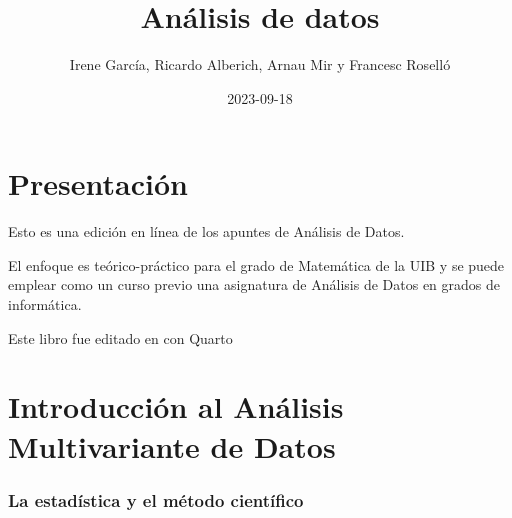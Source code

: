 \documentclass[
  letterpaper,
  DIV=11,
  numbers=noendperiod]{scrreprt}
\title{Análisis de datos}
\author{Irene García, Ricardo Alberich, Arnau Mir y Francesc Roselló}
\date{2023-09-18}
\renewcommand*\contentsname{Tabla de contenidos}
\newcommand\contentsname{Tabla de contenidos}
\begin{document}
\maketitle
\ifdefined\Shaded\renewenvironment{Shaded}{\begin{tcolorbox}[interior hidden, frame hidden, boxrule=0pt, sharp corners, enhanced, breakable, borderline west={3pt}{0pt}{shadecolor}]}{\end{tcolorbox}}\fi

\renewcommand*\contentsname{Tabla de contenidos}
{
\hypersetup{linkcolor=}
\setcounter{tocdepth}{2}
\tableofcontents
}

\hypertarget{presentaciuxf3n}{%
\chapter*{Presentación}\label{presentaciuxf3n}}


Esto es una edición en línea de los apuntes de Análisis de Datos.

El enfoque es teórico-práctico para el grado de Matemática de la UIB y
se puede emplear como un curso previo una asignatura de Análisis de
Datos en grados de informática.

Este libro fue editado en con Quarto


\hypertarget{introducciuxf3n-al-anuxe1lisis-multivariante-de-datos}{%
\chapter{Introducción al Análisis Multivariante de
Datos}\label{introducciuxf3n-al-anuxe1lisis-multivariante-de-datos}}

\hypertarget{la-estaduxedstica-y-el-muxe9todo-cientuxedfico}{%
\subsection{La estadística y el método
científico}\label{la-estaduxedstica-y-el-muxe9todo-cientuxedfico}}
\end{document}
